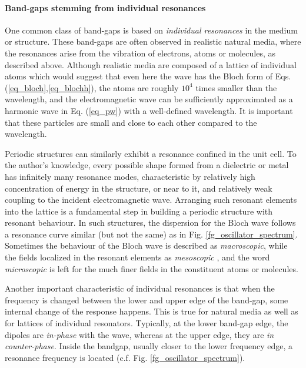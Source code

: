 \paragraph{Band-gaps stemming from individual resonances}%
One common class of band-gaps is based on \textit{individual resonances} in the medium or structure. These band-gaps are often observed in realistic natural media, where the resonances arise from the vibration of electrons, atoms or molecules, as described above. 
Although realistic media are composed of a lattice of individual atoms which would suggest that even here the wave has the Bloch form of Eqs. (\ref{eq_bloch},\ref{eq_blochh}), the atoms are roughly $10^{4}$ times smaller than the wavelength, and the electromagnetic wave can be sufficiently approximated as a harmonic wave in Eq. (\ref{eq_pw}) with a well-defined wavelength.
It is important that these particles are small and close to each other compared to the wavelength. %

Periodic structures can similarly exhibit a resonance confined in the unit cell. To the author's knowledge, every possible shape formed from a dielectric or metal has infinitely many resonance modes, characteristic by relatively high concentration of energy in the structure, or near to it, and relatively weak coupling to the incident electromagnetic wave. Arranging such resonant elements into the lattice is a fundamental step in building a periodic structure with resonant behaviour. In such structures, the dispersion for the Bloch wave follows a resonance curve similar (but not the same) as in Fig. \ref{fg_oscillator_spectrum}. Sometimes the behaviour of the Bloch wave is described as \textit{macroscopic}, while the fields localized in the resonant elements as \textit{mesoscopic} \cite{felbacq2005theory}, and the word \textit{microscopic} is left for the much finer fields in the constituent atoms or molecules.

Another important characteristic of individual resonances is that when the frequency is changed between the lower and upper edge of the band-gap, some internal change of the response happens. This is true for natural media as well as for lattices of individual resonators. Typically, at the lower band-gap edge, the dipoles are \textit{in-phase} with the wave, whereas at the upper edge, they are \textit{in counter-phase}. Inside the bandgap, usually closer to the lower frequency edge, a resonance frequency is located (c.f. Fig. \ref{fg_oscillator_spectrum}).

